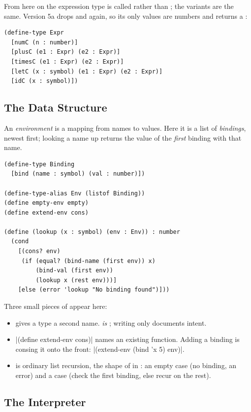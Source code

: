 From here on the expression type is called  rather than ; the variants are the same. Version 5a drops  and  again, so its only values are numbers and  returns a :
\begin{lstlisting}
(define-type Expr
  [numC (n : number)]
  [plusC (e1 : Expr) (e2 : Expr)]
  [timesC (e1 : Expr) (e2 : Expr)]
  [letC (x : symbol) (e1 : Expr) (e2 : Expr)]
  [idC (x : symbol)])
\end{lstlisting}

\subsection{The Data Structure}

\begin{definition}[Environment]
An \emph{environment} is a mapping from names to values. Here it is a list of \emph{bindings}, newest first; looking a name up returns the value of the \emph{first} binding with that name.
\end{definition}
\begin{lstlisting}
(define-type Binding
  [bind (name : symbol) (val : number)])

(define-type-alias Env (listof Binding))
(define empty-env empty)
(define extend-env cons)

(define (lookup (x : symbol) (env : Env)) : number
  (cond
    [(cons? env)
     (if (equal? (bind-name (first env)) x)
         (bind-val (first env))
         (lookup x (rest env)))]
    [else (error 'lookup "No binding found")]))
\end{lstlisting}
Three small pieces of  appear here:
\begin{itemize}
  \item {} gives a type a second name.  \emph{is} ; writing  only documents intent.
  \item \rkt|(define extend-env cons)| names an existing function. Adding a binding is consing it onto the front: \rkt|(extend-env (bind 'x 5) env)|.
  \item {} is ordinary list recursion, the shape of  in : an empty case (no binding, an error) and a  case (check the first binding, else recur on the rest).
\end{itemize}

\subsection{The Interpreter}

